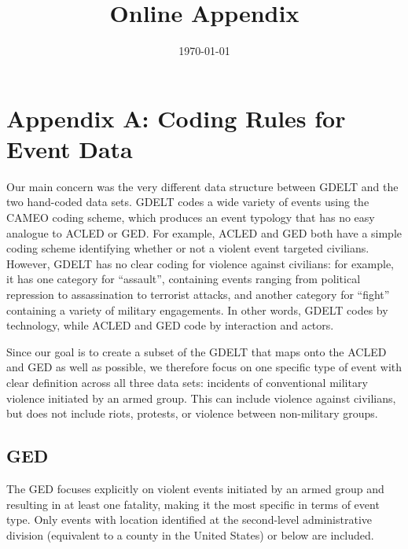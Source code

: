 \documentclass[hidelinks]{article}
\begin{document}
\title{Online Appendix}
\date{\today}
\maketitle
\vfill
\pagebreak

\doublespacing 

\section*{Appendix A: Coding Rules for Event Data}
Our main concern was the very different data structure between GDELT and the two hand-coded data sets. GDELT codes a wide variety of events using the CAMEO coding scheme, which produces an event typology that has no easy analogue to ACLED or GED. For example, ACLED and GED both have a simple coding scheme identifying whether or not a violent event targeted civilians. However, GDELT has no clear coding for violence against civilians: for example, it has one category for ``assault'', containing events ranging from political repression to assassination to terrorist attacks, and another category for ``fight'' containing a variety of military engagements. In other words, GDELT codes by technology, while ACLED and GED code by interaction and actors.

Since our goal is to create a subset of the GDELT that maps onto the ACLED and GED as well as possible, we therefore focus on one specific type of event with clear definition across all three data sets: incidents of conventional military violence initiated by an armed group. This can include violence against civilians, but does not include riots, protests, or violence between non-military groups.

\subsection*{GED}
The GED focuses explicitly on violent events initiated by an armed group and resulting in at least one fatality, making it the most specific in terms of event type. Only events with location identified at the second-level administrative division (equivalent to a county in the United States) or below are included.
\end{document}
